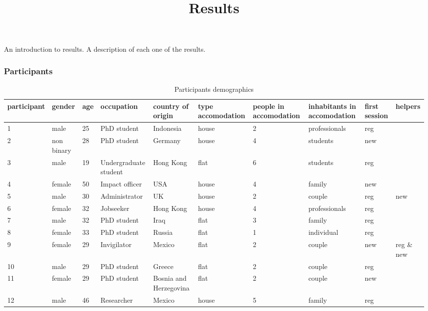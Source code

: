\documentclass[]{article}
\title{Results}
\author{}
\date{\vspace{-2.5em}}
\begin{document}
\maketitle

An introduction to results. A description of each one of the results.

\subsubsection{Participants}\label{participants}

\begin{table}

\caption{\label{tab:unnamed-chunk-1}Participants demographics}
\centering
\begin{tabular}[t]{l|l|l|l|l|l|l|l|l|l}
\hline
participant & gender & age & occupation & country of origin & type accomodation & people in accomodation & inhabitants in accomodation & first session & helpers\\
\hline
\rowcolor{gray!6}  1 & male & 25 & PhD student & Indonesia & house & 2 & professionals & reg & \\
\hline
2 & non binary & 28 & PhD student & Germany & house & 4 & students & new & \\
\hline
\rowcolor{gray!6}  3 & male & 19 & Undergraduate student & Hong Kong & flat & 6 & students & reg & \\
\hline
4 & female & 50 & Impact officer & USA & house & 4 & family & new & \\
\hline
\rowcolor{gray!6}  5 & male & 30 & Administrator & UK & house & 2 & couple & reg & new\\
\hline
6 & female & 32 & Jobseeker & Hong Kong & house & 4 & professionals & reg & \\
\hline
\rowcolor{gray!6}  7 & male & 32 & PhD student & Iraq & flat & 3 & family & reg & \\
\hline
8 & female & 33 & PhD student & Russia & flat & 1 & individual & reg & \\
\hline
\rowcolor{gray!6}  9 & female & 29 & Invigilator & Mexico & flat & 2 & couple & new & reg \& new\\
\hline
10 & male & 29 & PhD student & Greece & flat & 2 & couple & reg & \\
\hline
\rowcolor{gray!6}  11 & female & 29 & PhD student & Bosnia and Herzegovina & flat & 2 & couple & new & \\
\hline
12 & male & 46 & Researcher & Mexico & house & 5 & family & reg & \\

\end{tabular}
\end{table}
\end{document}

